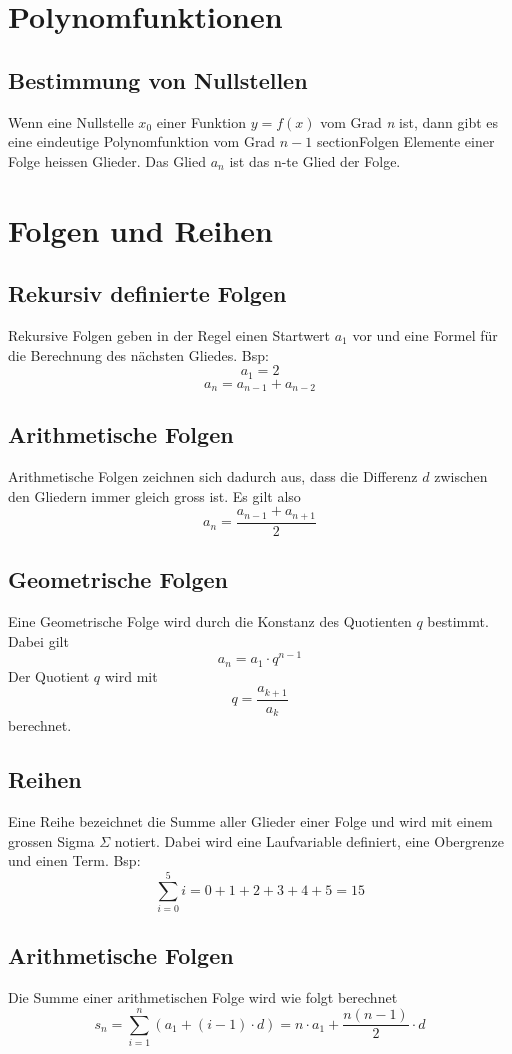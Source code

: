 \documentclass{article}
\author{Philipp Kiss}
\begin{document}
\tableofcontents
\newpage

\section{Polynomfunktionen}
\subsection{Bestimmung von Nullstellen}
Wenn eine Nullstelle \(x_0\) einer Funktion \(y = f(x)\) vom Grad \textit{n} ist, dann gibt es eine eindeutige Polynomfunktion vom Grad \(n-1\)
section{Folgen}
Elemente einer Folge heissen Glieder. Das Glied \(a_n\) ist das n-te Glied der Folge.
\section{Folgen und Reihen}
\subsection{Rekursiv definierte Folgen}
Rekursive Folgen geben in der Regel einen Startwert \(a_1\) vor und eine Formel für die Berechnung des nächsten Gliedes. Bsp: \[
a_1 = 2
\] \[
		a_n = a_{n-1} + a_{n-2}
\]
\subsection{Arithmetische Folgen}
Arithmetische Folgen zeichnen sich dadurch aus, dass die Differenz \(d\) zwischen den Gliedern immer gleich gross ist. Es gilt also \[
		a_n = \frac{a_{n-1} + a_{n+1}}{2} 
\]
\subsection{Geometrische Folgen}
Eine Geometrische Folge wird durch die Konstanz des Quotienten \(q\) bestimmt. Dabei gilt \[
		a_n = a_1 \cdot q^{n-1}
\]
Der Quotient \(q\) wird mit \[
		q = \frac{a_{k+1}}{a_k} 
\] berechnet.
\subsection{Reihen}
Eine Reihe bezeichnet die Summe aller Glieder einer Folge und wird mit einem grossen Sigma \(\Sigma\) notiert.
Dabei wird eine Laufvariable definiert, eine Obergrenze und einen Term. Bsp: \[
\sum_{i=0}^5 i = 0 + 1 + 2 + 3 + 4 + 5 = 15
\]
\subsection{Arithmetische Folgen}
Die Summe einer arithmetischen Folge wird wie folgt berechnet \[
		s_n = \sum_{i = 1}^n (a_1 + (i-1)\cdot d) = n \cdot a_1 + \frac{n(n-1)}{2} \cdot d
\]
\end{document}
